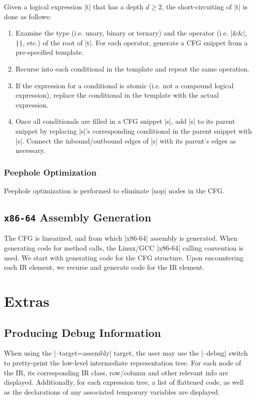 Given a logical expression |t| that has a depth $d \geq 2$, the short-circuiting of |t| is done as follows:
\begin{enumerate}
    \item Examine the type (i.e. unary, binary or ternary) and the operator (i.e. |&&|, \lstinline{||}, etc.) of the root of |t|. For each operator, generate a CFG snippet from a pre-specified template.
    \item Recurse into each conditional in the template and repeat the same operation.
    \item If the expression for a conditional is atomic (i.e. not a compound logical expression), replace the conditional in the template with the actual expression.
    \item Once all conditionals are filled in a CFG snippet |s|, add |s| to its parent snippet by replacing |s|'s corresponding conditional in the parent snippet with |s|. Connect the inbound/outbound edges of |s| with its parent's edges as necessary.
\end{enumerate}

\subsubsection{Peephole Optimization}

Peephole optimization is performed to eliminate |nop| nodes in the CFG.

\subsection{\lstinline{x86-64} Assembly Generation}

The CFG is linearized, and from which |x86-64| assembly is generated. When generating code for method calls, the Linux/GCC |x86-64| calling convention is used. We start with generating code for the CFG structure. Upon encountering each IR element, we recurse and generate code for the IR element.

\newpage

\section{Extras}

\subsection{Producing Debug Information}

When using the |--target=assembly| target, the user may use the |--debug| switch to pretty-print the low-level intermediate representation tree. For each node of the IR, its corresponding IR class, row/column and other relevant info are displayed. Additionally, for each expression tree, a list of flattened code, as well as the declarations of any associated temporary variables are displayed.

